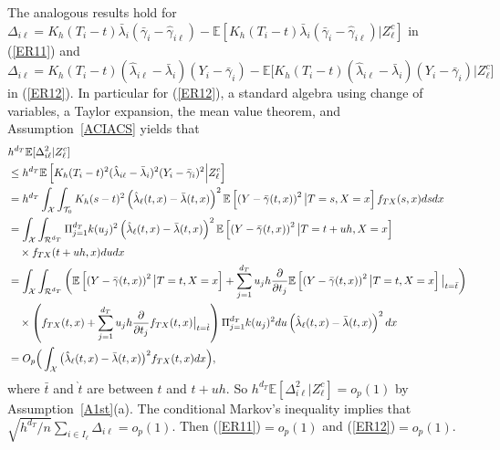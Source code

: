 \documentclass[lettersize, 12pt]{article}
\begin{document}
The analogous results hold for $\Delta_{i\ell} = K_h(T_i - t) \bar \lambda_i (\bar \gamma_i - \hat \gamma_{i\ell}) - \mathbb{E}\left[K_h(T_i - t) \bar \lambda_i (\bar \gamma_i - \hat \gamma_{i\ell})|Z_\ell^c\right]$  in (\ref{ER11}) and 
$\Delta_{i\ell} = K_h(T_i - t) (\hat \lambda_{i\ell} - \bar \lambda_i) (Y_i - \bar \gamma_i) - \mathbb{E}\big[K_h(T_i - t) (\hat \lambda_{i\ell} - \bar \lambda_i) (Y_i - \bar \gamma_i)\big|Z_\ell^c\big]$ in (\ref{ER12}).
In particular for (\ref{ER12}), a standard algebra using change of variables, a Taylor expansion, the mean value theorem, and Assumption~\ref{ACIACS} yields that 
{\small 
\begin{align}
&h^{d_T}\mathbb{E}[\Delta_{i\ell}^2|Z_\ell^c] 
\notag\\&\leq h^{d_T} \mathbb{E}\left[
K_h(T_i - t)^2 (\hat \lambda_{i\ell} - \bar{\lambda}_i)^2 (Y_i - \bar{\gamma}_i)^2\Big|Z_\ell^c 
\right]
\notag\\
&= h^{d_T} \int_\mathcal{X}
\int_{\mathcal{T}_0} K_h(s-t)^2 \left(\hat\lambda_\ell(t, x) - \bar{\lambda}(t,x)\right)^2
\mathbb{E}\left[\left(Y - \bar{\gamma}(t,x)\right)^2\big|T=s, X=x\right]
f_{TX}(s,x) dsdx
\notag\\
&=\int_\mathcal{X} \int_{\mathcal{R}^{d_T}} \Pi_{j=1}^{d_T}k(u_j)^{2} 
 \left(\hat\lambda_\ell(t, x) - \bar{\lambda}(t,x)\right)^2\mathbb{E}\left[\left(Y - \bar{\gamma}(t,x)\right)^2\big|T=t+uh, X=x\right]
\notag \\
&\ \ \ \times f_{TX}(t+uh,x) dudx
\notag\\
&=\int_\mathcal{X} \int_{\mathcal{R}^{d_T}} 
\bigg( \mathbb{E}\left[\left(Y - \bar{\gamma}(t,x)\right)^2\big|T=t, X=x\right]
+ \sum_{j=1}^{d_T}u_jh \frac{\partial}{\partial t_j} 
\mathbb{E}\left[\left(Y - \bar{\gamma}(t,x)\right)^2\big|T=t, X=x\right]
\big|_{t=\bar t}\bigg)
\notag\\ &\ \ \ \times 
\left( f_{TX}(t,x) +  \sum_{j=1}^{d_T}u_j h \frac{\partial}{\partial t_j}f_{TX}(t,x)\big|_{t=\grave t} \right)\Pi_{j=1}^{d_T}k(u_j)^{2} du 
\left(\hat\lambda_\ell(t, x) - \bar{\lambda}(t,x)\right)^2 dx
\notag\\
&= O_p\Big(\int_\mathcal{X} \big( \hat \lambda_{\ell}(t,x) - \bar{\lambda}(t,x) \big)^2 f_{TX}(t,x) dx\Big), 
\label{EThm1V}
\end{align}
}
where $\bar t$ and $\grave t$ are between $t$ and $t+uh$.
So $h^{d_T}\mathbb{E}[\Delta_{i\ell}^2|Z_\ell^c] = o_p(1)$ by Assumption~\ref{A1st}(a).
The conditional Markov's inequality implies that $\sqrt{h^{d_T}/n} \sum_{i\in I_\ell}  \Delta_{i\ell} =o_p(1)$.
Then (\ref{ER11})$=o_p(1)$ and (\ref{ER12})$=o_p(1)$.
\end{document}
